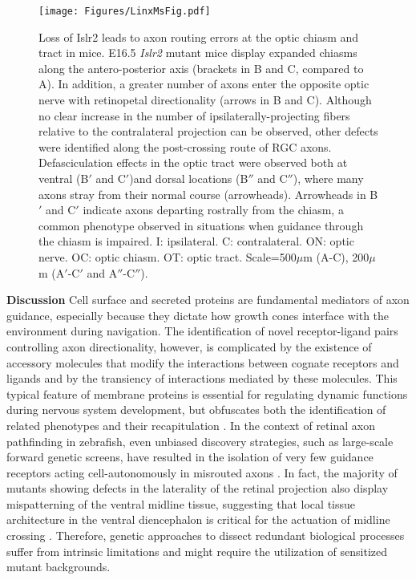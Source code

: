 \begin{figure}[hbtp]
    \begin{center}
        \texttt{[image: Figures/LinxMsFig.pdf]}
        \caption[Loss of Islr2 leads to axon routing errors at the optic chiasm and tract in mice.]
        {Loss of Islr2 leads to axon routing errors at the optic chiasm and tract in mice.
		E16.5 \emph{Islr2} mutant mice display expanded chiasms along the antero-posterior axis (brackets in B and C, compared to A).
		In addition, a greater number of axons enter the opposite optic nerve with retinopetal directionality (arrows in B and C).
		Although no clear increase in the number of ipsilaterally-projecting fibers relative to the contralateral projection can be observed, other defects were identified along the post-crossing route of RGC axons.
		Defasciculation effects in the optic tract were observed both at ventral (B$'$ and C$'$)and dorsal locations (B$''$ and C$''$), where many axons stray from their normal course (arrowheads).
		Arrowheads in B$'$ and C$'$ indicate axons departing rostrally from the chiasm, a common phenotype observed in situations when guidance through the chiasm is impaired. 
		I: ipsilateral.
		C: contralateral.
		ON: optic nerve.
		OC: optic chiasm.
		OT: optic tract.
		Scale=500$\mu$m (A-C), 200$\mu$m (A$'$-C$'$ and A$''$-C$''$).
		}
        \label{LinxMsFig}
    \end{center}
\end{figure}

\noindent\textbf{Discussion}\newline
\indent Cell surface and secreted proteins are fundamental mediators of axon guidance, especially because they dictate how growth cones interface with the environment during navigation.
The identification of novel receptor-ligand pairs controlling axon directionality, however, is complicated by the existence of accessory molecules that modify the interactions between cognate receptors and ligands and by the transiency of interactions mediated
by these molecules.
This typical feature of membrane proteins is essential for regulating dynamic functions during nervous system development, but obfuscates both the identification of related phenotypes and their recapitulation \exvivo{}.
In the context of retinal axon pathfinding in zebrafish, even unbiased discovery strategies, such as large-scale forward genetic screens, have resulted in the isolation of very few guidance receptors acting cell-autonomously in misrouted axons \cite{karlstrom1996zebrafish,trowe1996mutations}.
In fact, the majority of mutants showing defects in the laterality of the retinal projection also display mispatterning of the ventral midline tissue, suggesting that local tissue architecture in the ventral diencephalon is critical for the actuation of midline crossing \cite{barresi2005hedgehog,seth2006belladonna,bergeron2011brother}.
Therefore, genetic approaches to dissect redundant biological processes suffer from intrinsic limitations and might require the utilization of sensitized mutant backgrounds.

